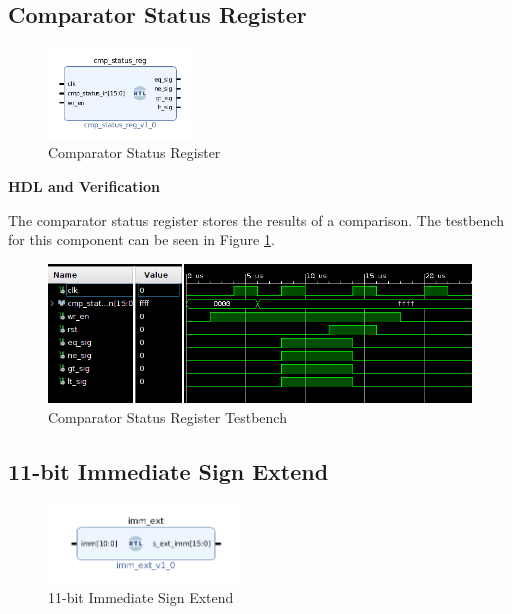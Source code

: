 \documentclass{article}
\newcommand{\stitle}{HDL and Verification}
\begin{document}
\begin{par}
	\newpage
	
	\subsection{Comparator Status Register}
	
	\begin{figure}[H]
		\centering
		\includegraphics[width=1.5in]{img/cmpStat.png}
		\caption{Comparator Status Register}
	\end{figure}
	
	\textbf{\stitle}
	\begin{par}
		The comparator status register stores the results of a comparison. The testbench for this component can be seen in Figure \ref{fig:cmpregtb}.
	\end{par}

	\begin{figure}[H]
		\centering
		\includegraphics[width=5in]{img/cmpregtb.png}
		\caption{Comparator Status Register Testbench}
		\label{fig:cmpregtb}
	\end{figure}

	\newpage
	
	\subsection{11-bit Immediate Sign Extend}
	
	\begin{figure}[H]
		\centering
		\includegraphics[width=2in]{img/immExt.png}
		\caption{11-bit Immediate Sign Extend}
	\end{figure}
	

\end{par}
\end{document}

